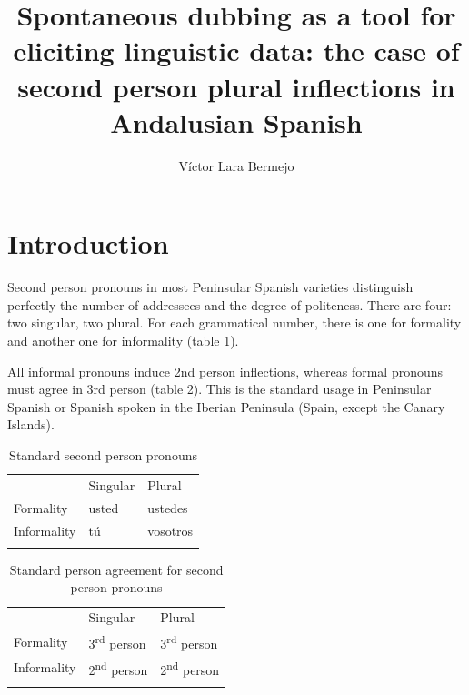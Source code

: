 \documentclass[output=paper]{LSP/langsci}
\author{Víctor Lara Bermejo\affiliation{Universidad Autónoma de Madrid}}
\title{Spontaneous dubbing as a tool for eliciting linguistic data: the case of second person plural inflections in Andalusian Spanish}
\begin{document}
  
%  
 
\section{Introduction}
Second person pronouns in most Peninsular Spanish varieties distinguish perfectly the number of addressees and the degree of politeness. There are four: two singular, two plural. For each grammatical number, there is one for formality and another one for informality (table 1).

All informal pronouns induce 2nd person inflections, whereas formal pronouns must agree in 3rd person (table 2). This is the standard usage in Peninsular Spanish or Spanish spoken in the Iberian Peninsula (Spain, except the Canary Islands).

\begin{table}
\begin{tabular}{lll} & Singular\par & Plural\par\\
\lsptoprule
 Formality\par & usted\par & ustedes\par\\
 Informality\par & tú\par & vosotros\par\\
\lspbottomrule
\end{tabular}
\label{tab:1}
\caption{Standard second person pronouns} 
\end{table}

\begin{table}
\begin{tabular}{lll} & Singular\par & Plural\par\\
\lsptoprule
 Formality\par & 3\textsuperscript{rd} person\par & 3\textsuperscript{rd} person\par\\
 Informality\par & 2\textsuperscript{nd} person\par & 2\textsuperscript{nd} person\par\\
\lspbottomrule
\end{tabular}
\label{tab:2}
\caption{Standard person agreement for second person pronouns} 
\end{table}
\end{document}

